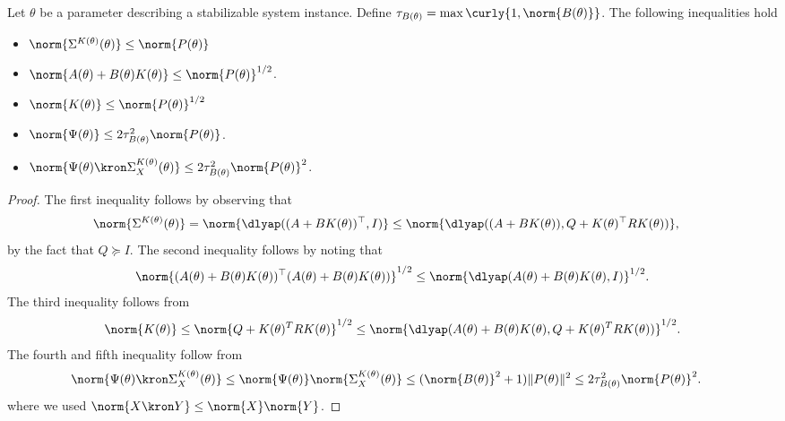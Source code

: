 \begin{lemma}
    \label{lem: simplifying inequalities}
    Let $\theta$ be a parameter describing a stabilizable system instance. 
    Define $\tau_{B(\theta)} = \max\curly{1, \norm{B(\theta)}}$.
    The following inequalities hold 
    \begin{itemize}
        \item $\norm{\Sigma^{K(\theta)}(\theta)} \leq \norm{P(\theta)}$
        \item $\norm{A(\theta) + B(\theta) K(\theta)} \leq \norm{P(\theta)}^{1/2}$. 
        \item $\norm{K(\theta)}\leq\norm{P(\theta)}^{1/2}$
        \item $\norm{\Psi(\theta)} \leq 2 \tau_{B(\theta)}^2 \norm{P(\theta)}$.
        \item $\norm{\Psi(\theta)\kron\Sigma_X^{K(\theta)}(\theta)} \leq 2\tau^2_{B(\theta)}\norm{P(\theta)}^2$. 
    \end{itemize}
\end{lemma}
\begin{proof}
    The first inequality follows by observing that 
    \begin{align*}
        \norm{\Sigma^{K(\theta)}(\theta)} &= \norm{\dlyap((A+BK(\theta))^\top, I)} 
        \leq \norm{\dlyap((A+BK(\theta)), Q + K(\theta)^\top R K(\theta))},
    \end{align*}
    by the fact that $Q \succeq I$. The second inequality follows by noting that 
    \begin{align*}
        \norm{(A(\theta) + B(\theta) K(\theta))^\top (A(\theta) + B(\theta) K(\theta))}^{1/2} \leq \norm{\dlyap(A(\theta)+B(\theta)K(\theta), I)}^{1/2}.    
    \end{align*}
    The third inequality follows from
    \begin{align*}
        \norm{K(\theta)} \leq \norm{Q+K(\theta)^TRK(\theta)}^{1/2} \leq \norm{\dlyap(A(\theta)+B(\theta)K(\theta), Q+K(\theta)^TRK(\theta))}^{1/2}.
    \end{align*}
    The fourth and fifth inequality follow from
    \begin{align*}
        \norm{\Psi(\theta)\kron\Sigma_X^{K(\theta)}(\theta)} &\leq \norm{\Psi(\theta)}\norm{\Sigma_X^{K(\theta)}(\theta)} \leq (\norm{B(\theta)}^2+1)\|P(\theta)\|^2\leq 2\tau^2_{B(\theta)}\norm{P(\theta)}^2. 
    \end{align*}
    where we used $\norm{X\kron Y}\leq\norm{X}\norm{Y}$.
\end{proof}


